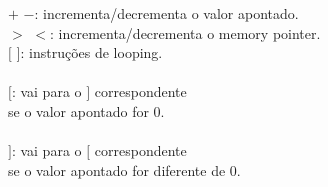 \documentclass[preview]{standalone}
\begin{document}
$+$ $-$: incrementa/decrementa o valor apontado.\\$>$ $<$: incrementa/decrementa o memory pointer.\\$[$ $]$: instruções de looping.\\\\$[$: vai para o $]$ correspondente\\se o valor apontado for 0.\\\\$]$: vai para o $[$ correspondente\\se o valor apontado for diferente de 0.\\
\end{document}
